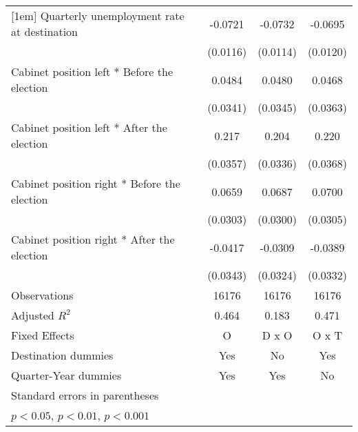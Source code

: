 \begin{table}[htbp]
\begin{tabular}{l*{3}{c}}
[1em]
Quarterly unemployment rate at destination&     -0.0721\sym{***}&     -0.0732\sym{***}&     -0.0695\sym{***}\\
                    &    (0.0116)         &    (0.0114)         &    (0.0120)         \\
[1em]
Cabinet position left * Before the election&      0.0484         &      0.0480         &      0.0468         \\
                    &    (0.0341)         &    (0.0345)         &    (0.0363)         \\
[1em]
Cabinet position left * After the election&       0.217\sym{***}&       0.204\sym{***}&       0.220\sym{***}\\
                    &    (0.0357)         &    (0.0336)         &    (0.0368)         \\
[1em]
Cabinet position right * Before the election&      0.0659\sym{*}  &      0.0687\sym{*}  &      0.0700\sym{*}  \\
                    &    (0.0303)         &    (0.0300)         &    (0.0305)         \\
[1em]
Cabinet position right * After the election&     -0.0417         &     -0.0309         &     -0.0389         \\
                    &    (0.0343)         &    (0.0324)         &    (0.0332)         \\
\hline
Observations        &       16176         &       16176         &       16176         \\
Adjusted \(R^{2}\)  &       0.464         &       0.183         &       0.471         \\
Fixed Effects       &           O         &       D x O         &       O x T         \\
Destination dummies &         Yes         &          No         &         Yes         \\
Quarter-Year dummies&         Yes         &         Yes         &          No         \\
\hline\hline
\multicolumn{4}{l}{\footnotesize Standard errors in parentheses}\\
\multicolumn{4}{l}{\footnotesize \sym{*} \(p<0.05\), \sym{**} \(p<0.01\), \sym{***} \(p<0.001\)}\\
\end{tabular}
\end{table}
